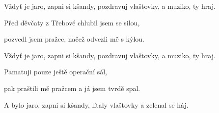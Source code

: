 Vždyť je jaro, zapni si kšandy,
pozdravuj vlaštovky, a muziko, ty hraj.
\ks

\zs
Před děvčaty z Třebové chlubil jsem se silou,

pozvedl jsem pražec, načež odvezli mě s kýlou.

Vždyť je jaro, zapni si kšandy,
pozdravuj vlaštovky, a muziko, ty hraj.
\ks

\zs
Pamatuji pouze ještě operační sál,

pak praštili mě pražcem a já jsem tvrdě spal.

A bylo jaro, zapni si kšandy,
lítaly vlaštovky a zelenal se háj.
\ks

\kp


















